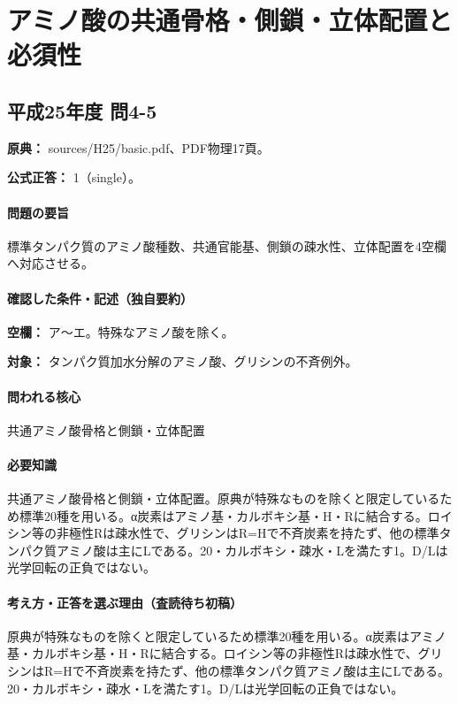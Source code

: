 \section{アミノ酸の共通骨格・側鎖・立体配置と必須性}

\subsection{平成25年度 問4-5}
\label{q:h25-reg-basic-4-5}

\noindent\textbf{原典：} sources/H25/basic.pdf、PDF物理17頁。

\textbf{公式正答：} 1（single）。

\paragraph{問題の要旨} 標準タンパク質のアミノ酸種数、共通官能基、側鎖の疎水性、立体配置を4空欄へ対応させる。

\paragraph{確認した条件・記述（独自要約）}\mbox{}\par

\noindent\textbf{空欄：} ア〜エ。特殊なアミノ酸を除く。\par

\noindent\textbf{対象：} タンパク質加水分解のアミノ酸、グリシンの不斉例外。\par

\paragraph{問われる核心} 共通アミノ酸骨格と側鎖・立体配置

\paragraph{必要知識} 共通アミノ酸骨格と側鎖・立体配置。原典が特殊なものを除くと限定しているため標準20種を用いる。α炭素はアミノ基・カルボキシ基・H・Rに結合する。ロイシン等の非極性Rは疎水性で、グリシンはR=\allowbreak{}Hで不斉炭素を持たず、他の標準タンパク質アミノ酸は主にLである。20・カルボキシ・疎水・Lを満たす1。D/Lは光学回転の正負ではない。

\paragraph{考え方・正答を選ぶ理由（査読待ち初稿）} 原典が特殊なものを除くと限定しているため標準20種を用いる。α炭素はアミノ基・カルボキシ基・H・Rに結合する。ロイシン等の非極性Rは疎水性で、グリシンはR=\allowbreak{}Hで不斉炭素を持たず、他の標準タンパク質アミノ酸は主にLである。20・カルボキシ・疎水・Lを満たす1。D/Lは光学回転の正負ではない。

